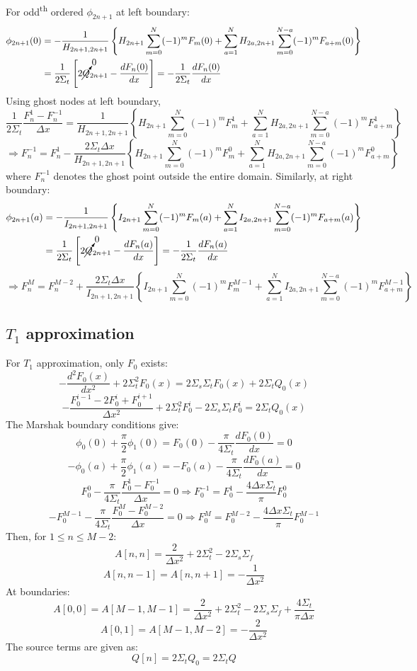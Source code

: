 \documentclass[11pt]{article}
\begin{document}
\begin{spacing}{1.5}
\[\]
For odd\textsuperscript{th} ordered $\phi_{2n+1}$ at left boundary:
\[
\begin{aligned}
\phi_{2n+1}(0)&=-\frac{1}{H_{2n+1,2n+1}}\left\{H_{2n+1}\sum_{m=0}^{N}(-1)^{m}F_{m}(0)+\sum_{a=1}^{N}H_{2a,2n+1}\sum_{m=0}^{N-a}(-1)^{m}F_{a+m}(0)\right\}\\
&=\frac{1}{2\Sigma_t}\left[2\cancelto{0}{Q}_{2n+1}-\frac{dF_{n}(0)}{dx}\right]=-\frac{1}{2\Sigma_t}\frac{dF_{n}(0)}{dx}
\end{aligned}
\]
Using ghost nodes at left boundary, 
\[
\frac{1}{2\Sigma_t}\frac{F_{n}^1-F_{n}^{-1}}{\Delta x}=\frac{1}{H_{2n+1,2n+1}}\left\{H_{2n+1}\sum_{m=0}^{N}(-1)^{m}F_{m}^1+\sum_{a=1}^{N}H_{2a,2n+1}\sum_{m=0}^{N-a}(-1)^{m}F_{a+m}^1\right\}
\]
\[
\boxed{
\Longrightarrow F_n^{-1}=F_n^1-\frac{2\Sigma_t\Delta x}{H_{2n+1,2n+1}}\left\{H_{2n+1}\sum_{m=0}^{N}(-1)^{m}F_{m}^0+\sum_{a=1}^{N}H_{2a,2n+1}\sum_{m=0}^{N-a}(-1)^{m}F_{a+m}^0\right\}
}
\]
where $F_n^{-1}$ denotes the ghost point outside the entire domain.
Similarly, at right boundary:
\[
\begin{aligned}
\phi_{2n+1}(a)&=-\frac{1}{I_{2n+1,2n+1}}\left\{I_{2n+1}\sum_{m=0}^{N}(-1)^{m}F_{m}(a)+\sum_{a=1}^{N}I_{2a,2n+1}\sum_{m=0}^{N-a}(-1)^{m}F_{a+m}(a)\right\}\\
&=\frac{1}{2\Sigma_t}\left[2\cancelto{0}{Q}_{2n+1}-\frac{dF_{n}(a)}{dx}\right]=-\frac{1}{2\Sigma_t}\frac{dF_{n}(a)}{dx}
\end{aligned}
\]
\[
\boxed{
\Longrightarrow F_n^{M}=F_n^{M-2}+\frac{2\Sigma_t\Delta x}{I_{2n+1,2n+1}}\left\{I_{2n+1}\sum_{m=0}^{N}(-1)^{m}F_{m}^{M-1}+\sum_{a=1}^{N}I_{2a,2n+1}\sum_{m=0}^{N-a}(-1)^{m}F_{a+m}^{M-1}\right\}
}
\]
\subsection{$T_1$ approximation}
For $T_1$ approximation, only $F_0$ exists:
\[
-\frac{d^2F_{0}(x)}{dx^2}+2\Sigma_t^2F_{0}(x)=2\Sigma_s\Sigma_tF_{0}(x)+2\Sigma_tQ_{0}(x)
\]
\[
-\frac{F_0^{i-1}-2F_0^i+F_0^{i+1}}{\Delta x^2}+2\Sigma_t^2F_{0}^i-2\Sigma_s\Sigma_tF_{0}^i=2\Sigma_tQ_{0}(x)
\]
The Marshak boundary conditions give:
\[
\phi_0(0)+\frac{\pi}{2}\phi_1(0)=F_0(0)-\frac{\pi}{4\Sigma_t}\frac{dF_0(0)}{dx}=0
\]
\[
-\phi_0(a)+\frac{\pi}{2}\phi_1(a)=-F_0(a)-\frac{\pi}{4\Sigma_t}\frac{dF_0(a)}{dx}=0
\]
\[
F_0^0-\frac{\pi}{4\Sigma_t}\frac{F_0^1-F_0^{-1}}{\Delta x}=0\Longrightarrow F_0^{-1}=F_0^1-\frac{4\Delta x\Sigma_t}{\pi}F_0^0
\]
\[
-F_0^{M-1}-\frac{\pi}{4\Sigma_t}\frac{F_0^M-F_0^{M-2}}{\Delta x}=0\Longrightarrow F_0^{M}=F_0^{M-2}-\frac{4\Delta x\Sigma_t}{\pi}F_0^{M-1}
\]
Then, for $1\le n\le M-2$:
\[
A[n,n]=\frac{2}{\Delta x^2}+2\Sigma_t^2-2\Sigma_s\Sigma_f
\]
\[
A[n,n-1]=A[n,n+1]=-\frac{1}{\Delta x^2}
\]
At boundaries:
\[
A[0,0]=A[M-1,M-1]=\frac{2}{\Delta x^2}+2\Sigma_t^2-2\Sigma_s\Sigma_f+\frac{4\Sigma_t}{\pi\Delta x}
\]
\[
A[0,1]=A[M-1,M-2] = -\frac{2}{\Delta x^2}
\]
The source terms are given as:
\[
Q[n]=2\Sigma_tQ_0=2\Sigma_tQ
\]
\newpage

\end{spacing}
\end{document}
